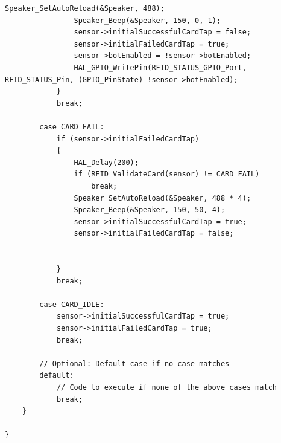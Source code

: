\documentclass{article}
\begin{document}
\begin{lstlisting}[caption={STM32 RC522 Firmware Implementation}, label={lst:stm32_rfidsensor_code}]
	    		Speaker_SetAutoReload(&Speaker, 488);
	    		Speaker_Beep(&Speaker, 150, 0, 1);
	    		sensor->initialSuccessfulCardTap = false;
	    		sensor->initialFailedCardTap = true;
	    		sensor->botEnabled = !sensor->botEnabled;
	    		HAL_GPIO_WritePin(RFID_STATUS_GPIO_Port, RFID_STATUS_Pin, (GPIO_PinState) !sensor->botEnabled);
	    	}
	        break;

	    case CARD_FAIL:
	    	if (sensor->initialFailedCardTap)
	    	{
	    		HAL_Delay(200);
				if (RFID_ValidateCard(sensor) != CARD_FAIL)
					break;
				Speaker_SetAutoReload(&Speaker, 488 * 4);
				Speaker_Beep(&Speaker, 150, 50, 4);
				sensor->initialSuccessfulCardTap = true;
				sensor->initialFailedCardTap = false;


	    	}
	        break;

	    case CARD_IDLE:
	    	sensor->initialSuccessfulCardTap = true;
	    	sensor->initialFailedCardTap = true;
	        break;

	    // Optional: Default case if no case matches
	    default:
	        // Code to execute if none of the above cases match
	        break;
	}

}

\end{lstlisting}
\end{document}
